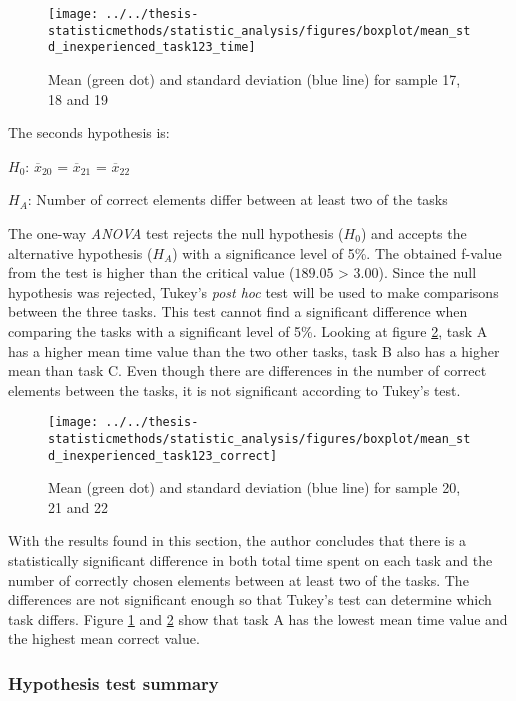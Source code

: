 \begin{figure}[H]
	\centering
	\texttt{[image: ../../thesis-statisticmethods/statistic\_analysis/figures/boxplot/mean\_std\_inexperienced\_task123\_time]}
	\caption{Mean (green dot) and standard deviation (blue line) for sample 17, 18 and 19}
	\label{fig:meanstdinexperiencedtask123time}
\end{figure}

The seconds hypothesis is:\\
\centerline{$H_{0}$: $\overline{x}_{20}$ = $\overline{x}_{21}$ = $\overline{x}_{22}$}
\centerline{$H_{A}$: Number of correct elements differ between at least two of the tasks}
\vspace{0.2cm}

The one-way \textit{ANOVA} test rejects the null hypothesis ($H_0$) and accepts the alternative hypothesis ($H_{A}$) with a significance level of 5\%. The obtained f-value from the test is higher than the critical value ($189.05$ > $3.00$). Since the null hypothesis was rejected, Tukey's \textit{post hoc} test will be used to make comparisons between the three tasks. This test cannot find a significant difference when comparing the tasks with a significant level of 5\%. Looking at figure \ref{fig:meanstdinexperiencedtask123correct}, task A has a higher mean time value than the two other tasks, task B also has a higher mean than task C. Even though there are differences in the number of correct elements between the tasks, it is not significant according to Tukey's test. 

\begin{figure}[H]
	\centering
	\texttt{[image: ../../thesis-statisticmethods/statistic\_analysis/figures/boxplot/mean\_std\_inexperienced\_task123\_correct]}
	\caption{Mean (green dot) and standard deviation (blue line) for sample 20, 21 and 22}
	\label{fig:meanstdinexperiencedtask123correct}
\end{figure}

With the results found in this section, the author concludes that there is a statistically significant difference in both total time spent on each task and the number of correctly chosen elements between at least two of the tasks. The differences are not significant enough so that Tukey's test can determine which task differs. Figure \ref{fig:meanstdinexperiencedtask123time} and \ref{fig:meanstdinexperiencedtask123correct} show that task A has the lowest mean time value and the highest mean correct value. 

\subsubsection{Hypothesis test summary}

